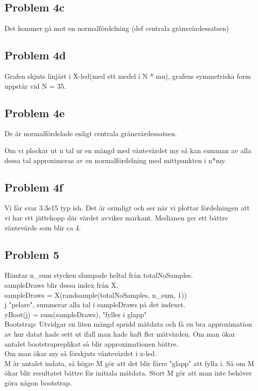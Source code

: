 \documentclass{article}
\begin{document}
\subsection*{Problem 4c}
Det kommer gå mot en normalfördelning (def centrala gränsvärdessatsen)
\subsection*{Problem 4d}
Grafen skjuts linjärt i X-led(med ett medel i N * mu), grafens symmetriska form
uppstår vid N = 35.
\subsection*{Problem 4e}
De är normalfördelade enligt centrala gränsvärdessatsen. 

Om vi plockar ut n tal ur en mängd med väntevärdet my så kan summan av alla
dessa tal approximeras av en normalfördelning med mittpunkten i n*my.  
\subsection*{Problem 4f}
Vi får svar 3.3e15 typ ish. Det är orimligt och ser när vi plottar fördelningen
att vi har ett jättehopp där värdet avviker markant. Medianen ger ett bättre
väntevärde som blir ca 4.
\subsection*{Problem 5}
Hämtar n\_sum stycken slumpade heltal från totalNoSamples. \\sampleDraws blir
dessa index från X. \\ sampleDraws = X(randsample(totalNoSamples, n\_sum, 1)) \\j
"pelare", summerar alla tal i sampleDraws på det indexet. \\ yBoot(j) =
sum(sampleDraws), "fyller i glapp"
\\
Bootstrap: Utvidgar en liten mängd spridd mätdata och få en bra approximation av
hur datat hade sett ut ifall man hade haft fler mätvärden. Om man ökar antalet
bootstrapreplikat så blir approximationen bättre.
\\Om man ökar my så förskjuts väntevärdet i x-led.
\\M är antalet indata, så högre M gör att det blir färre "glapp" att fylla i. Så
om M ökar blir resultatet bättre för initiala mätdata. Stort M gör att man inte
behöver göra någon bootstrap.
\end{document}

